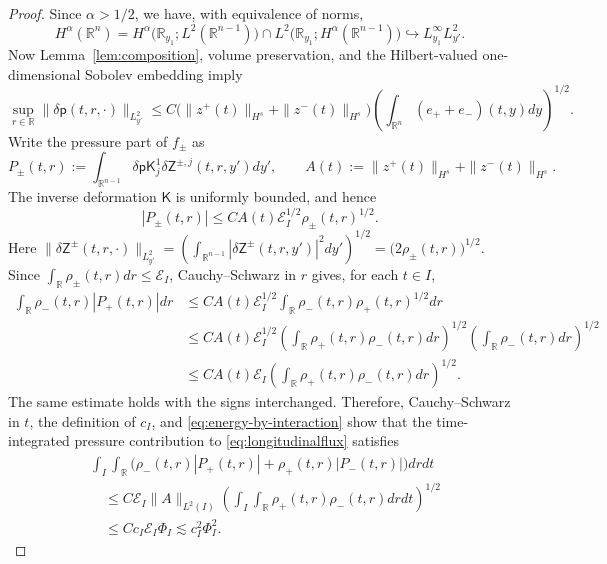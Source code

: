 \documentclass[11pt,reqno]{amsart}
\theoremstyle{plain}
\theoremstyle{definition}
\theoremstyle{remark}
\numberwithin{equation}{section}
\newcommand{\Kmat}{\mathsf K}
\newcommand{\Real}{\mathbb R}
\newcommand{\Rn}{\Real^n}
\begin{document}
\begin{proof}
Since $\alpha>1/2$, we have, with equivalence of norms,
\begin{equation}\label{eq:bochner-embedding}
H^\alpha(\mathbb{R}^n)
=H^\alpha\bigl(\mathbb{R}_{y_1};L^2(\mathbb{R}^{n-1})\bigr)
 \cap L^2\bigl(\mathbb{R}_{y_1};H^\alpha(\mathbb{R}^{n-1})\bigr)
\hookrightarrow L^\infty_{y_1}L^2_{y'}.
\end{equation}
Now Lemma~\ref{lem:composition}, volume preservation, and
the Hilbert-valued one-dimensional Sobolev embedding imply
\[
 \sup_{r\in\Real}
 \|\delta\mathsf p(t,r,\cdot)\|_{L^2_{y'}}
 \le C\bigl(\|z^+(t)\|_{H^s}+\|z^-(t)\|_{H^s}\bigr)
 \left(\int_{\Rn}(e_++e_-)(t,y) dy\right)^{1/2}.
\]
Write the pressure part of $f_\pm$ as
\[
 P_\pm(t,r):=
 \int_{\Real^{n-1}}
 \delta\mathsf p\Kmat_j^1\delta\mathsf Z^{\pm,j}
 (t,r,y')dy',
 \qquad
 A(t):=\|z^+(t)\|_{H^s}+\|z^-(t)\|_{H^s}.
\]
The inverse deformation $\Kmat$ is uniformly bounded, and hence
\[
 |P_\pm(t,r)|
 \le CA(t)
 \mathcal E_I^{1/2}\rho_\pm(t,r)^{1/2}.
\]
Here $\|\delta\mathsf Z^\pm(t,r,\cdot)\|_{L^2_{y'}}
 =\left(\int_{\Real^{n-1}}
 |\delta\mathsf Z^\pm(t,r,y')|^2dy'\right)^{1/2}
 =\bigl(2\rho_\pm(t,r)\bigr)^{1/2}$.  Since
$\int_{\Real}\rho_\pm(t,r)dr\le\mathcal E_I$, Cauchy--Schwarz in $r$
gives, for each $t\in I$,
\[
\begin{aligned}
 \int_{\Real}\rho_-(t,r)|P_+(t,r)|dr
 &\le CA(t)\mathcal E_I^{1/2}
 \int_{\Real}\rho_-(t,r)\rho_+(t,r)^{1/2}dr\\
 &\le CA(t)\mathcal E_I^{1/2}
 \left(\int_{\Real}\rho_+(t,r)\rho_-(t,r)dr\right)^{1/2}
 \left(\int_{\Real}\rho_-(t,r)dr\right)^{1/2}\\
 &\le CA(t)\mathcal E_I
 \left(\int_{\Real}\rho_+(t,r)\rho_-(t,r)dr\right)^{1/2}.
\end{aligned}
\]
The same estimate holds with the signs interchanged.  Therefore,
Cauchy--Schwarz in $t$, the definition of $c_I$, and
\eqref{eq:energy-by-interaction} show that the time-integrated pressure
contribution to \eqref{eq:longitudinalflux} satisfies
\begin{equation}\label{eq:pressurefluxbound}
\begin{aligned}
 &\int_I\int_{\Real}
 \bigl(\rho_-(t,r)|P_+(t,r)|
       +\rho_+(t,r)|P_-(t,r)|\bigr)drdt\\
 &\quad\le C\mathcal E_I
 \|A\|_{L^2(I)}
 \left(\int_I\int_{\Real}\rho_+(t,r)\rho_-(t,r)drdt\right)^{1/2}\\
 &\quad\le Cc_I\mathcal E_I\Phi_I
 \lesssim c_I^2\Phi_I^2.
\end{aligned}
\end{equation}


\end{proof}
\end{document}
